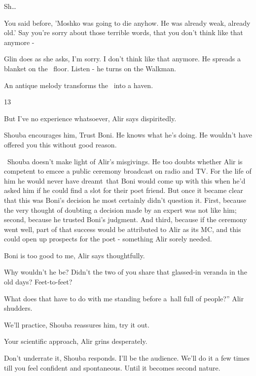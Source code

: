\documentclass[letterpaper]{article}
\begin{document}
{\textquotedbl}Sh{\dots}{\textquotedbl} 

{\textquotedbl}You said before, 'Moshko was going to die anyhow. He was already weak, already old.' Say you're sorry
about those terrible words, that you don't think like that anymore -{\textquotedbl} 

Glin does as she asks, {\textquotedbl}I'm sorry. I don't think like that anymore.{\textquotedbl} He spreads a blanket on
the \ floor. {\textquotedbl}Listen -{\textquotedbl} he turns on the Walkman.

An antique melody transforms the \ into a haven.


\bigskip

13

{\textquotedbl}But I've no experience whatsoever,{\textquotedbl} Alir says dispiritedly.

Shouba encourages him, {\textquotedbl}Trust Boni. He knows what he's doing. He wouldn't have offered you this without
good reason.{\textquotedbl} 

~Shouba doesn't make light of Alir's misgivings. He too doubts whether Alir is competent to emcee a public ceremony
broadcast on radio and TV. For the life of him he would never have dreamt~that Boni would come up with this when he'd
asked him if he could find a slot for their poet friend. But once it became clear that this was Boni's decision he most
certainly didn't question it. First, because the very thought of doubting a decision made by an expert was not like
him; second, because he trusted Boni's judgment. And third, because if the ceremony went well, part of that success
would be attributed to Alir as its MC, and this could open up prospects for the poet - something Alir sorely needed.

{\textquotedbl}Boni is too good to me,{\textquotedbl} Alir says thoughtfully.

{\textquotedbl}Why wouldn't he be? Didn't the two of you share that glassed-in veranda in the old days?
Feet-to-feet?{\textquotedbl}

{\textquotedbl}What does that have to do with me standing before a~hall full of people?'' Alir shudders. 

{\textquotedbl}We'll practice,{\textquotedbl} Shouba reassures him, {\textquotedbl}try it out.{\textquotedbl} 

{\textquotedbl}Your scientific approach,{\textquotedbl} Alir grins desperately. 

{\textquotedbl}Don't underrate it,{\textquotedbl} Shouba responds. {\textquotedbl}I'll be the audience. We'll do it a
few times till you feel confident and spontaneous. Until it becomes second nature.{\textquotedbl} 
\end{document}
